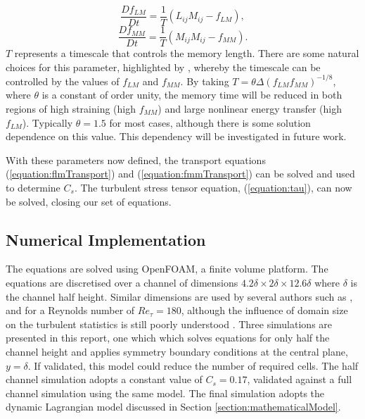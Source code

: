 \documentclass[12pt,oneside,a4paper]{article}
\begin{document}
\begin{equation}
\label{equation:flmTransport}
\frac{D f_{LM}}{Dt} = \frac{1}{T}(L_{ij}M_{ij} - f_{LM}),
\end{equation}
\begin{equation}
\label{equation:fmmTransport}
\frac{D f_{MM}}{Dt} = \frac{1}{T}(M_{ij}M_{ij} - f_{MM}).
\end{equation}
$T$ represents a timescale that controls the memory length. There are some natural choices for this parameter, highlighted by \cite{meneveau1996}, whereby the timescale can be controlled by the values of $f_{LM}$ and $f_{MM}$. By taking $T=\theta \Delta (f_{LM} f_{MM})^{-1/8}$, where $\theta$ is a constant of order unity, the memory time will be reduced in both regions of high straining (high $f_{MM}$) and large nonlinear energy transfer (high $f_{LM}$). Typically $\theta=1.5$ for most cases, although there is some solution dependence on this value. This dependency will be investigated in future work. 

With these parameters now defined, the transport equations (\ref{equation:flmTransport}) and (\ref{equation:fmmTransport}) can be solved and used to determine $C_s$. The turbulent stress tensor equation, (\ref{equation:tau}), can now be solved, closing our set of equations.

\subsection{Numerical Implementation}
The equations are solved using OpenFOAM, a finite volume platform. The equations are discretised over a channel of dimensions $4.2\delta \times 2\delta \times 12.6\delta$ where $\delta$ is the channel half height. Similar dimensions are used by several authors such as \cite{moser1999}, and \cite{vreman2014} for a Reynolds number of $Re_\tau = 180$, although the influence of domain size on the turbulent statistics is still poorly understood \citep{vreman2014}. Three simulations are presented in this report, one which which solves equations for only half the channel height and applies symmetry boundary conditions at the central plane, $y=\delta$. If validated, this model could reduce the number of required cells. The half channel simulation adopts a constant value of $C_s = 0.17$, validated against a full channel simulation using the same model. The final simulation adopts the dynamic Lagrangian model discussed in Section \ref{section:mathematicalModel}.
\end{document}
